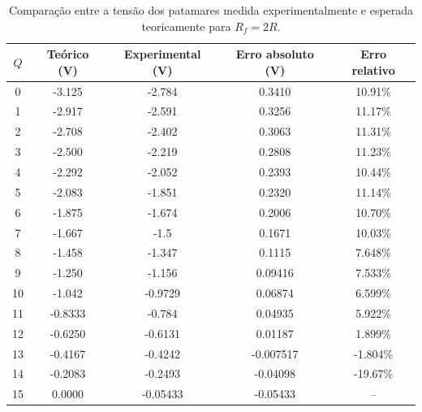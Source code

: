 \documentclass[a4paper, oneside]{article}
\begin{document}
\begin{table}[ht]
	\centering
	\caption{Comparação entre a tensão dos patamares medida experimentalmente e esperada teoricamente para $R_f = 2R$.}
	\label{tab:Pat2R_exp}
	\begin{tabular}{ccccc}
		$Q$ & Teórico (V) & Experimental (V) & Erro absoluto (V) & Erro relativo\\
		\hline
		0 & -3.125 & -2.784 & 0.3410 & 10.91\%\\ 
		1 & -2.917 & -2.591 & 0.3256 & 11.17\%\\
		2 & -2.708 & -2.402 & 0.3063 & 11.31\%\\ 
		3 & -2.500 & -2.219 & 0.2808 & 11.23\%\\ 
		4 & -2.292 & -2.052 & 0.2393 & 10.44\%\\ 
		5 & -2.083 & -1.851 & 0.2320 & 11.14\%\\ 
		6 & -1.875 & -1.674 & 0.2006 & 10.70\%\\ 
		7 & -1.667 & -1.5 & 0.1671 & 10.03\%\\ 
		8 & -1.458 & -1.347 & 0.1115 & 7.648\%\\ 
		9 & -1.250& -1.156 & 0.09416 & 7.533\%\\ 
		10& -1.042 & -0.9729 & 0.06874 & 6.599\%\\ 
		11& -0.8333 & -0.784 & 0.04935 & 5.922\%\\ 
		12& -0.6250 & -0.6131 & 0.01187 & 1.899\%\\ 
		13& -0.4167 & -0.4242 & -0.007517 & -1.804\%\\ 
		14& -0.2083 & -0.2493 & -0.04098 & -19.67\%\\ 
		15& 0.0000 & -0.05433 & -0.05433 & -- \\
		\hline
	\end{tabular}
\end{table}
\end{document}
